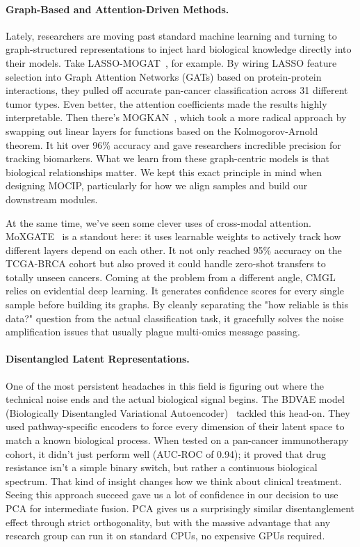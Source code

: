\documentclass[12pt,a4paper,onecolumn]{article}
\begin{document}
\paragraph{Graph-Based and Attention-Driven Methods.}
Lately, researchers are moving past standard machine learning and turning to graph-structured representations to inject hard biological knowledge directly into their models. Take LASSO-MOGAT~\cite{alharbi2024lassomogat}, for example. By wiring LASSO feature selection into Graph Attention Networks (GATs) based on protein-protein interactions, they pulled off accurate pan-cancer classification across 31 different tumor types. Even better, the attention coefficients made the results highly interpretable. Then there's MOGKAN~\cite{alharbi2025mogkan}, which took a more radical approach by swapping out linear layers for functions based on the Kolmogorov-Arnold theorem. It hit over 96\% accuracy and gave researchers incredible precision for tracking biomarkers. What we learn from these graph-centric models is that biological relationships matter. We kept this exact principle in mind when designing MOCIP, particularly for how we align samples and build our downstream modules.

At the same time, we've seen some clever uses of cross-modal attention. MoXGATE~\cite{dip2025moxgate} is a standout here: it uses learnable weights to actively track how different layers depend on each other. It not only reached 95\% accuracy on the TCGA-BRCA cohort but also proved it could handle zero-shot transfers to totally unseen cancers. Coming at the problem from a different angle, CMGL~\cite{fan2026cmgl} relies on evidential deep learning. It generates confidence scores for every single sample before building its graphs. By cleanly separating the "how reliable is this data?" question from the actual classification task, it gracefully solves the noise amplification issues that usually plague multi-omics message passing.

\paragraph{Disentangled Latent Representations.}
One of the most persistent headaches in this field is figuring out where the technical noise ends and the actual biological signal begins. The BDVAE model (Biologically Disentangled Variational Autoencoder)~\cite{tariq2025bdvae} tackled this head-on. They used pathway-specific encoders to force every dimension of their latent space to match a known biological process. When tested on a pan-cancer immunotherapy cohort, it didn't just perform well (AUC-ROC of 0.94); it proved that drug resistance isn't a simple binary switch, but rather a continuous biological spectrum. That kind of insight changes how we think about clinical treatment. Seeing this approach succeed gave us a lot of confidence in our decision to use PCA for intermediate fusion. PCA gives us a surprisingly similar disentanglement effect through strict orthogonality, but with the massive advantage that any research group can run it on standard CPUs, no expensive GPUs required.
\end{document}
